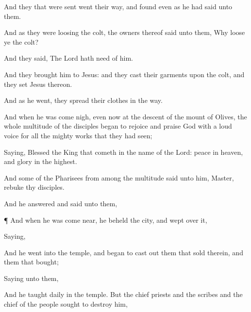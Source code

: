 {And they
that were sent
went their
way, and
found even
as he had
said unto
them.

And as
they were
loosing the
colt, the
owners
thereof
said
unto
them,
Why loose
ye the
colt?

And they
said, The
Lord
hath
need of
him.

And they
brought
him
to
Jesus:
and they
cast
their
garments
upon the
colt, and they
set
Jesus
thereon.

And as
he
went, they
spread
their
clothes
in the
way.

And when
he was come
nigh, even
now
at the
descent of the
mount of
Olives, the
whole
multitude of the
disciples
began to
rejoice and
praise
God with a
loud
voice
for
all the mighty
works
that they had
seen;

Saying,
Blessed
{} the
King
that
cometh
in the
name of the
Lord:
peace
in
heaven,
and
glory
in the
highest.

And
some of the
Pharisees
from among the
multitude
said
unto
him,
Master,
rebuke
thy
disciples.

And he
answered and
said unto
them,
{}


\par }{\PP {}¶
And
when he was come
near, he
beheld the
city, and
wept
over
it,

Saying,
{}



And he
went
into the
temple, and
began to cast
out them
that
sold
therein,
and them that
bought;

Saying unto
them,
{}

And he
taught
daily
in the
temple.
But the chief
priests
and the
scribes
and the
chief of the
people
sought to
destroy
him,

}
